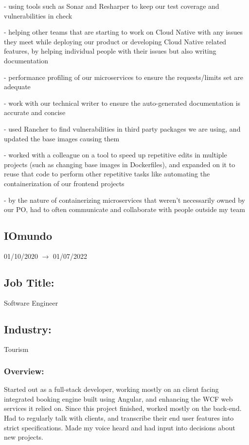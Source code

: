 \documentclass[a4paper,hidelinks,11pt]{article}
\begin{document}
- using tools such as Sonar and Resharper to keep our test coverage and vulnerabilities in check

- helping other teams that are starting to work on Cloud Native with any issues they meet
while deploying our product or developing Cloud Native related features, by helping individual
people with their issues but also writing documentation

- performance profiling of our microservices to ensure the requests/limits set are adequate

- work with our technical writer to ensure the auto-generated documentation is accurate and
concise

- used Rancher to find vulnerabilities in third party packages we are using, and updated the
base images causing them

- worked with a colleague on a tool to speed up repetitive edits in multiple projects (such as
changing base images in Dockerfiles), and expanded on it to reuse that code to perform other
repetitive tasks like automating the containerization of our frontend projects

- by the nature of containerizing microservices that weren’t necessarily owned by our PO, had
to often communicate and collaborate with people outside my team

\subsection{IOmundo} 01/10/2020 $\rightarrow$ 01/07/2022
\subsection{Job Title:} Software Engineer
\subsection{Industry:} Tourism
\subsubsection{Overview:}
Started out as a full-stack developer, working mostly on an client facing integrated booking engine built using Angular, and enhancing the WCF web services it relied on. Since this project finished, worked mostly on the back-end. Had to regularly talk with clients, and transcribe their end user features into strict specifications. Made my voice heard and had input into decisions about new projects.
\end{document}
